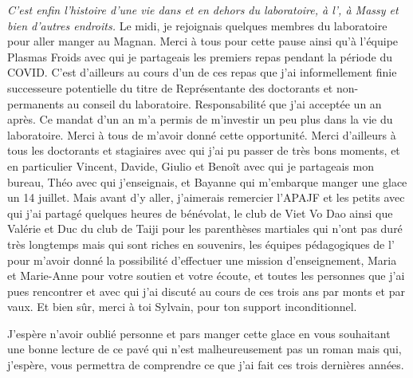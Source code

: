 {\it C'est enfin l'histoire d'une vie dans et en dehors du laboratoire, à l', à Massy et bien d'autres endroits.} Le midi, je rejoignais quelques membres du laboratoire pour aller manger au Magnan. Merci à tous pour cette pause ainsi qu'à l'équipe Plasmas Froids avec qui je partageais les premiers repas pendant la période du COVID. C'est d'ailleurs au cours d'un de ces repas que j'ai informellement finie successeure potentielle du titre de Représentante des doctorants et non-permanents au conseil du laboratoire. Responsabilité que j'ai acceptée un an après. Ce mandat d'un an m'a permis de m'investir un peu plus dans la vie du laboratoire. Merci à tous de m'avoir donné cette opportunité. Merci d'ailleurs à tous les doctorants et stagiaires avec qui j'ai pu passer de très bons moments, et en particulier Vincent, Davide, Giulio et Benoît avec qui je partageais mon bureau, Théo avec qui j'enseignais, et Bayanne qui m'embarque manger une glace un 14 juillet. Mais avant d'y aller, j'aimerais remercier l'APAJF et les petits avec qui j'ai partagé quelques heures de bénévolat, le club de Viet Vo Dao ainsi que Valérie et Duc du club de Taiji pour les parenthèses martiales qui n'ont pas duré très longtemps mais qui sont riches en souvenirs, les équipes pédagogiques de l' pour m'avoir donné la possibilité d'effectuer une mission d'enseignement, Maria et Marie-Anne pour votre soutien et votre écoute, et toutes les personnes que j'ai pues rencontrer et avec qui j'ai discuté au cours de ces trois ans par monts et par vaux. Et bien sûr, merci à toi Sylvain, pour ton support inconditionnel. 

J'espère n'avoir oublié personne et pars manger cette glace en vous souhaitant une bonne lecture de ce pavé qui n'est malheureusement pas un roman mais qui, j'espère, vous permettra de comprendre ce que j'ai fait ces trois dernières années.

